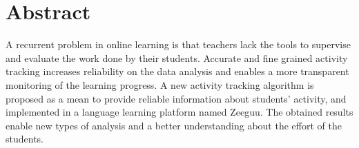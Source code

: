\begingroup
\let\clearpage\relax
\let\cleardoublepage\relax
\let\cleardoublepage\relax

\chapter*{Abstract}
A recurrent problem in online learning is that teachers lack the tools to supervise and evaluate the work done by their students. Accurate and fine grained activity tracking increases reliability on the data analysis and enables a more transparent monitoring of the learning progress. A new activity tracking algorithm is proposed as a mean to provide reliable information about students' activity, and implemented in a language learning platform named Zeeguu. The obtained results enable new types of analysis and a better understanding about the effort of the students.




\vfill
%

\endgroup

\vfill
